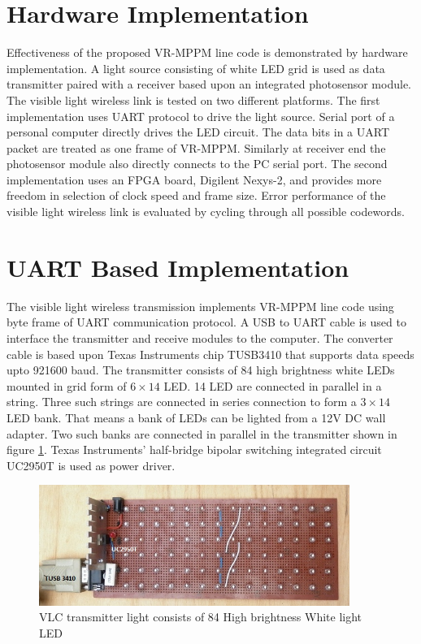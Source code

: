 \section{Hardware Implementation}
Effectiveness of the proposed VR-MPPM line code is demonstrated by hardware implementation. A light source consisting of white LED grid is used as data transmitter paired with a receiver based upon an integrated photosensor module. The visible light wireless link is tested on two different platforms. The first implementation uses UART protocol to drive the light source. Serial port of a personal computer directly drives the LED circuit. The data bits in a UART packet are treated as one frame of VR-MPPM. Similarly at receiver end the photosensor module also directly connects to the PC serial port. The second implementation uses an FPGA board, Digilent Nexys-2\cite{nexys2}, and provides more freedom in selection of clock speed and frame size. Error performance of the visible light wireless link is evaluated by cycling through all possible codewords.

\section{UART Based Implementation}
The visible light wireless transmission implements VR-MPPM line code using byte frame of UART communication protocol. A USB to UART cable is used to interface the transmitter and receive modules to the computer. The converter cable is based upon Texas Instruments chip TUSB3410\cite{TUSB3410} that supports data speeds upto 921600 baud. The transmitter consists of 84 high brightness white LEDs mounted in grid form of $6\times 14$ LED. 14 LED are connected in parallel in a string. Three such strings are connected in series connection to form a $3\times 14$ LED bank. That means a bank of LEDs can be lighted from a 12V DC wall adapter. Two such banks are connected in parallel in the transmitter shown in figure \ref{fig:tx_hardware}. Texas Instruments' half-bridge bipolar switching integrated circuit UC2950T \cite{UC2950} is used as power driver.

\begin{figure}[hbtp]
\centering
\includegraphics[angle=0,width=0.9\textwidth]{./Figures/Transmitter.jpg}
\caption[VLC transmitter hardware]{VLC transmitter light consists of 84 High brightness White light LED}
 \label{fig:tx_hardware}
\end{figure}

